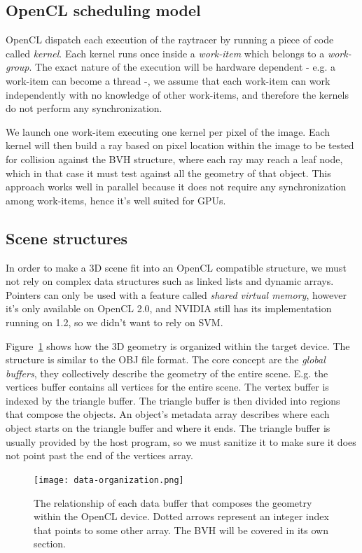\documentclass{vgtc}
\begin{document}
\subsection{OpenCL scheduling model}

OpenCL dispatch each execution of the raytracer by running a piece of
code called \emph{kernel}. Each kernel runs once inside a
\emph{work-item} which belongs to a \emph{work-group}. The exact
nature of the execution will be hardware dependent - e.g. a work-item
can become a thread -, we assume that each work-item can work
independently with no knowledge of other work-items, and therefore the
kernels do not perform any synchronization.

We launch one work-item executing one kernel per pixel of the
image. Each kernel will then build a ray based on pixel location
within the image to be tested for collision against the BVH structure,
where each ray may reach a leaf node, which in that case it must test
against all the geometry of that object. This approach works well in
parallel because it does not require any synchronization among
work-items, hence it's well suited for GPUs.


\subsection{Scene structures}

In order to make a 3D scene fit into an OpenCL compatible structure,
we must not rely on complex data structures such as linked lists and
dynamic arrays. Pointers can only be used with a feature called
\emph{shared virtual memory}, however it's only available on OpenCL
2.0, and NVIDIA still has its implementation running on 1.2, so we
didn't want to rely on SVM.

Figure~\ref{fig:data-org} shows how the 3D geometry is organized
within the target device. The structure is similar to the OBJ file
format. The core concept are the \emph{global buffers}, they
collectively describe the geometry of the entire scene. E.g. the
vertices buffer contains all vertices for the entire scene. The vertex
buffer is indexed by the triangle buffer. The triangle buffer is then
divided into regions that compose the objects. An object's metadata
array describes where each object starts on the triangle buffer and
where it ends. The triangle buffer is usually provided by the host
program, so we must sanitize it to make sure it does not point past
the end of the vertices array.

\begin{figure}
\centering
\texttt{[image: data-organization.png]}
\caption{The relationship of each data buffer that composes the
  geometry within the OpenCL device. Dotted arrows represent an
  integer index that points to some other array. The BVH will be
  covered in its own section.}
\label{fig:data-org}
\end{figure}
\end{document}
